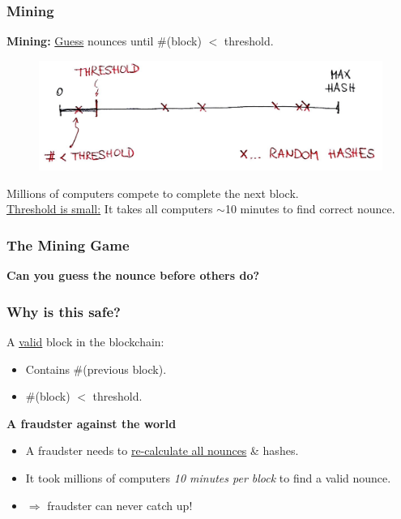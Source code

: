 \documentclass[12pt]{beamer}
\theoremstyle{definition}
\numberwithin{equation}{section}
\begin{document}
\begin{frame}
\frametitle{Mining}
\textbf{Mining:} \underline{Guess} nounces until \#(block) $<$ threshold.

\begin{figure}
\includegraphics[scale=0.28, trim = {30mm 0mm 0mm 0mm}]{fig5}
\end{figure}
Millions of computers compete to complete the next block.\\
\underline{Threshold is small:} It takes all computers $\sim$10 minutes to find correct nounce.
\end{frame}

\begin{frame}
\frametitle{The Mining Game}
\textbf{Can you guess the nounce before others do?}
\end{frame}

\begin{frame}
\frametitle{Why is this safe?}
A \underline{valid} block in the blockchain:
\begin{itemize}
\item Contains \#(previous block).
\item \#(block) $<$ threshold.
\end{itemize}
\bigskip

\textbf{A fraudster against the world}
\begin{itemize}
\item A fraudster needs to \underline{re-calculate all nounces} \& hashes.
\item It took millions of computers \emph{10 minutes per block} to find a valid nounce.
\item $\Rightarrow$ fraudster can never catch up!
\end{itemize}
\end{frame}
\end{document}
